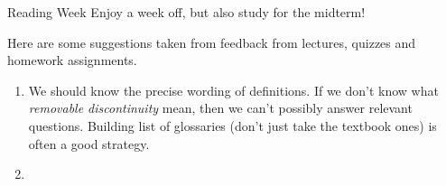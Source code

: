 \documentclass[../main.tex]{subfiles}
\begin{document}
\begin{lesson}{Reading Week}
  Enjoy a week off, but also study for the midterm!

  Here are some suggestions taken from feedback from lectures, quizzes and homework assignments. 

  \begin{enumerate}
    \item We should know the precise wording of definitions. If we don't know what \emph{removable discontinuity} mean, then we can't possibly answer relevant questions. Building  list of glossaries (don't just take the textbook ones) is often a good strategy.

    \item 
      
  \end{enumerate}
\end{lesson}
\end{document}
